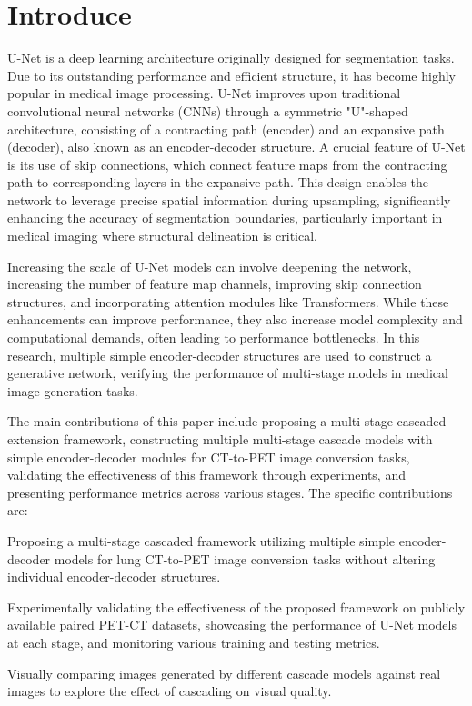 \documentclass[twocolumn]{article}
\begin{document}
\section{Introduce}
U-Net is a deep learning architecture originally designed for segmentation tasks. Due to its outstanding performance and efficient structure, it has become highly popular in medical image processing. U-Net improves upon traditional convolutional neural networks (CNNs) through a symmetric "U"-shaped architecture, consisting of a contracting path (encoder) and an expansive path (decoder), also known as an encoder-decoder structure. A crucial feature of U-Net is its use of skip connections, which connect feature maps from the contracting path to corresponding layers in the expansive path. This design enables the network to leverage precise spatial information during upsampling, significantly enhancing the accuracy of segmentation boundaries, particularly important in medical imaging where structural delineation is critical.

Increasing the scale of U-Net models can involve deepening the network, increasing the number of feature map channels, improving skip connection structures, and incorporating attention modules like Transformers. While these enhancements can improve performance, they also increase model complexity and computational demands, often leading to performance bottlenecks. In this research, multiple simple encoder-decoder structures are used to construct a generative network, verifying the performance of multi-stage models in medical image generation tasks.

The main contributions of this paper include proposing a multi-stage cascaded extension framework, constructing multiple multi-stage cascade models with simple encoder-decoder modules for CT-to-PET image conversion tasks, validating the effectiveness of this framework through experiments, and presenting performance metrics across various stages. The specific contributions are:

Proposing a multi-stage cascaded framework utilizing multiple simple encoder-decoder models for lung CT-to-PET image conversion tasks without altering individual encoder-decoder structures.

Experimentally validating the effectiveness of the proposed framework on publicly available paired PET-CT datasets, showcasing the performance of U-Net models at each stage, and monitoring various training and testing metrics.

Visually comparing images generated by different cascade models against real images to explore the effect of cascading on visual quality.
\end{document}
